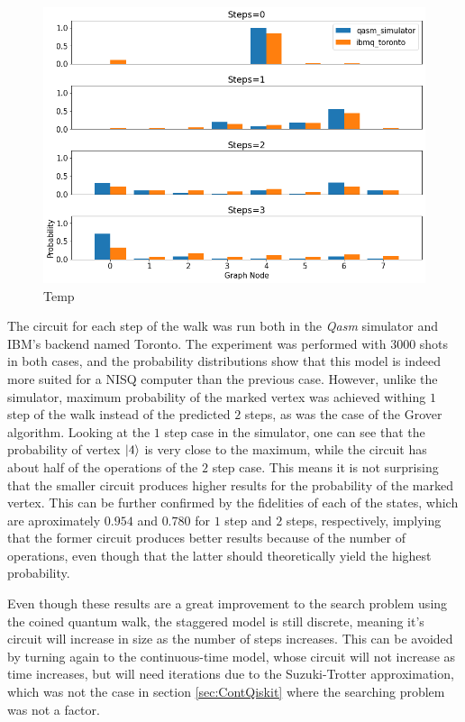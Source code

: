 \documentclass[../../dissertation.tex]{subfiles}
\begin{document}
\begin{figure}[!h]
	\centering
	\includegraphics[scale=0.40]{img/Qiskit/StaggeredQW/Search/stagSearchToronto_N3_S0123.png}
	\caption{Temp}
	\label{fig:stagSearchResultsToronto}
\end{figure}
The circuit for each step of the walk was run both in the \textit{Qasm}
simulator and IBM's backend named Toronto. The experiment was performed with
$3000$ shots in both cases, and the probability distributions show that this model is indeed more suited for a NISQ computer than the previous case. However, unlike the simulator, maximum probability of the marked vertex was achieved
withing $1$ step of the walk instead of the predicted $2$ steps, as was the case of the Grover algorithm. Looking at the $1$ step case in the simulator, one can see that the probability of vertex $\ket{4}$ is very close to the maximum, while the circuit has about half of the operations of the $2$ step case. This means it is not surprising that the smaller circuit produces higher results for the probability of the marked vertex. 
This can be further confirmed by the fidelities of each of the states,
which are aproximately $0.954$ and $0.780$ for $1$ step and $2$ steps,
respectively, implying that the former circuit produces better results because
of the number of operations, even though that the latter should theoretically
yield the highest probability.\par
Even though these results are a great improvement to the search problem using the coined quantum walk, the staggered model is still discrete, meaning it's circuit will increase in size as the number of steps increases. This can be avoided by turning again to the continuous-time model, whose circuit will not increase as time increases, but will need iterations due to the Suzuki-Trotter approximation, which was not the case in section \ref{sec:ContQiskit} where the searching problem was not a factor.
\end{document}
